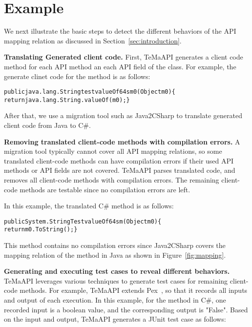 \section{Example}
\label{sec:example}

We next illustrate the basic steps to detect the different behaviors of the API mapping relation as discussed in Section~\ref{sec:introduction}.

\textbf{Translating Generated client code.} First, TeMaAPI generates a client code method for each API method an each API field of the  class. For example, the generate clinet code for the  method is as follows:

\begin{CodeOut}%
\begin{alltt}
  public java.lang.String testvalueOf64sm0(Object m0)\{
    return java.lang.String.valueOf(m0);\}
\end{alltt}
\end{CodeOut}


After that, we use a migration tool such as Java2CSharp to translate generated client code from Java to C\#. 

\textbf{Removing translated client-code methods with compilation errors.} A migration tool typically cannot cover all API mapping relations, so some translated client-code methods can have compilation errors if their used API methods or API fields are not covered. TeMaAPI parses translated code, and removes all client-code methods with compilation errors. The remaining client-code methods are testable since no compilation errors are left.

In this example, the translated C\#  method is as follows:
\begin{CodeOut}%
\begin{alltt}
  public System.String TestvalueOf64sm(Object m0) \{
    return m0.ToString();\}
\end{alltt}
\end{CodeOut}

This method contains no compilation errors since Java2CSharp covers the mapping relation of the method in Java as shown in Figure~\ref{fig:mapping}.

\textbf{Generating and executing test cases to reveal different behaviors.} TeMaAPI leverages various techniques to generate test cases for remaining client-code methods. For example, TeMaAPI extends Pex~\cite{tillmann2008pex}, so that it records all inputs and output of each execution. In this example, for the  method in C\#, one recorded input is a boolean value, and the corresponding output is "False". Based on the input and output, TeMaAPI generates a JUnit test case as follows:

